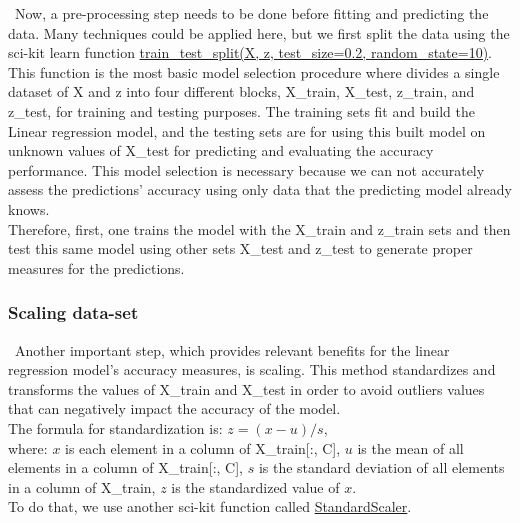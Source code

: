 \quad \, Now, a pre-processing step needs to be done before fitting and predicting the data. Many techniques could be applied here, but we first split the data using the sci-kit learn function \href{https://scikit-learn.org/stable/modules/generated/sklearn.model_selection.train_test_split.html}{train\_test\_split(X, z, test\_size=0.2, random\_state=10)}. This function is the most basic model selection procedure where divides a single dataset of X and z into four different blocks, X\_train, X\_test, z\_train, and z\_test, for training and testing purposes. The training sets fit and build the Linear regression model, and the testing sets are for using this built model on unknown values of X\_test for predicting and evaluating the accuracy performance. This model selection is necessary because we can not accurately assess the predictions' accuracy using only data that the predicting model already knows.\\

Therefore, first, one trains the model with the X\_train and z\_train sets and then test this same model using other sets X\_test and z\_test to generate proper measures for the predictions.\\

\subsubsection{Scaling data-set}
\label{chap:Scaling data-set}

\quad \, Another important step, which provides relevant benefits for the linear regression model's accuracy measures, is scaling. This method standardizes and transforms the values of X\_train and X\_test in order to avoid outliers values that can negatively impact the accuracy of the model.\\

The formula for standardization is: $z = (x - u) / s$,\\

\noindent where: $x$ is each element in a column of X\_train[:, C], $u$ is the mean of all elements in a column of X\_train[:, C], $s$ is the standard deviation of all elements in a column of X\_train, $z$ is the standardized value of $x$.\\

To do that, we use another sci-kit function called \href{https://scikit-learn.org/stable/modules/generated/sklearn.preprocessing.StandardScaler.html}{StandardScaler}.\\

